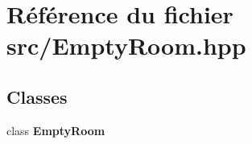 \section{Référence du fichier src/\-Empty\-Room.hpp}
\label{_empty_room_8hpp}
\subsection*{Classes}
\begin{DoxyCompactItemize}
\item 
class {\bf Empty\-Room}
\end{DoxyCompactItemize}
